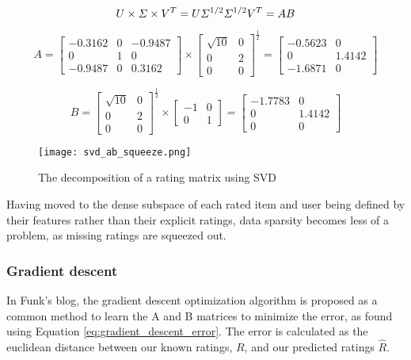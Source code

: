 \begin{equation}\label{eq:svd_AB_squeezing}
	\centering
	U\times \Sigma \times V^T = U\Sigma^{1/2} \Sigma^{1/2}V^T = AB
\end{equation}

\begin{equation}\label{eq:svd_AB_num_squeezing_A}
A = \begin{bmatrix}
-0.3162 & 0 & -0.9487\\ 
0 & 1 & 0\\ 
-0.9487 & 0 & 0.3162
\end{bmatrix} \times
\begin{bmatrix}
\sqrt{10} & 0\\ 
0 & 2\\ 
0 & 0
\end{bmatrix}^{\frac{1}{2}} =
\begin{bmatrix}
-0.5623 & 0\\ 
0 & 1.4142\\ 
-1.6871 & 0
\end{bmatrix}
\end{equation}

\begin{equation}\label{eq:svd_AB_num_squeezing_B}
B = \begin{bmatrix}
\sqrt{10} & 0\\ 
0 & 2\\ 
0 & 0
\end{bmatrix}^{\frac{1}{2}} \times
\begin{bmatrix}
-1 & 0\\ 
0 & 1
\end{bmatrix} =
\begin{bmatrix}
-1.7783 & 0\\ 
0 & 1.4142\\ 
0 & 0
\end{bmatrix}
\end{equation}

\begin{figure}[H]
	\centering
	\texttt{[image: svd\_ab\_squeeze.png]}
	\caption{The decomposition of a rating matrix using SVD\cite{recsys_dimensionalityreduction}}
	\label{fig:svdSqueeze}
\end{figure}
Having moved to the dense subspace of each rated item and user being defined by their features rather than their explicit ratings, data sparsity becomes less of a problem, as missing ratings are squeezed out.

\subsubsection{Gradient descent}
In Funk's blog, the gradient descent optimization algorithm is proposed as a common method to learn the A and B matrices to minimize the error, as found using Equation \ref{eq:gradient_descent_error}. The error is calculated as the euclidean distance between our known ratings, $R$, and our predicted ratings $\hat{R}$.

